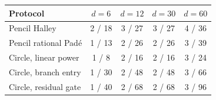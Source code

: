 \begin{tabularx}{\linewidth}{@{}Xcccc@{}}\toprule
Protocol & $d=6$ & $d=12$ & $d=30$ & $d=60$\\\midrule
Pencil Halley & 2 / 18 & 3 / 27 & 3 / 27 & 4 / 36\\
Pencil rational Pad\'e & 1 / 13 & 2 / 26 & 2 / 26 & 3 / 39\\
Circle, linear power & 1 / 8 & 2 / 16 & 2 / 16 & 3 / 24\\
Circle, branch entry & 1 / 30 & 2 / 48 & 2 / 48 & 3 / 66\\
Circle, residual gate & 1 / 40 & 2 / 68 & 2 / 68 & 3 / 96\\
\bottomrule\end{tabularx}
